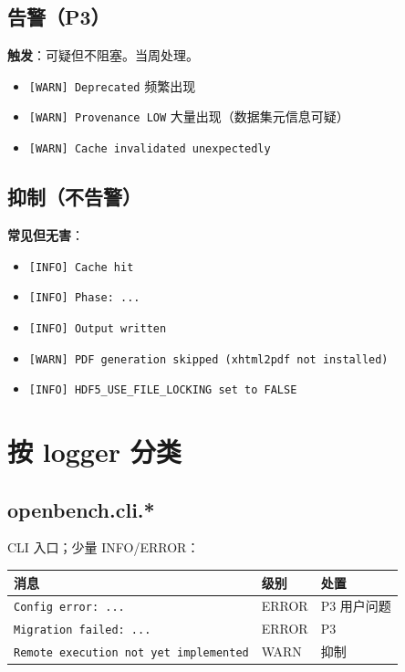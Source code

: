 \subsection{告警（P3）}

\textbf{触发}：可疑但不阻塞。当周处理。

\begin{itemize}
  \item \texttt{[WARN] Deprecated} 频繁出现
  \item \texttt{[WARN] Provenance LOW} 大量出现（数据集元信息可疑）
  \item \texttt{[WARN] Cache invalidated unexpectedly}
\end{itemize}

\subsection{抑制（不告警）}

\textbf{常见但无害}：

\begin{itemize}
  \item \texttt{[INFO] Cache hit}
  \item \texttt{[INFO] Phase: ...}
  \item \texttt{[INFO] Output written}
  \item \texttt{[WARN] PDF generation skipped (xhtml2pdf not installed)}
  \item \texttt{[INFO] HDF5\_USE\_FILE\_LOCKING set to FALSE}
\end{itemize}

\section{按 logger 分类}

\subsection{openbench.cli.*}

CLI 入口；少量 INFO/ERROR：

\begin{longtable}{p{6cm} p{2cm} p{4cm}}
  \toprule
  消息 & 级别 & 处置 \\
  \midrule
  \endhead
  \texttt{Config error: ...} & ERROR & P3 用户问题 \\
  \texttt{Migration failed: ...} & ERROR & P3 \\
  \texttt{Remote execution not yet implemented} & WARN & 抑制 \\
  \bottomrule
\end{longtable}

